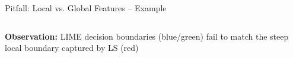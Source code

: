 \documentclass[10pt,compress,t,notes=noshow, xcolor=table]{beamer}
\begin{document}
\begin{frame}{Pitfall: Local vs. Global Features -- Example}
\begin{columns}[T, totalwidth=\textwidth]
\begin{column}{0.37\textwidth}
\textbf{Observation:} LIME decision boundaries (blue/green) fail to match the steep local boundary captured by LS (red)

  \end{column}
\end{columns}
        
\end{frame}
\end{document}
